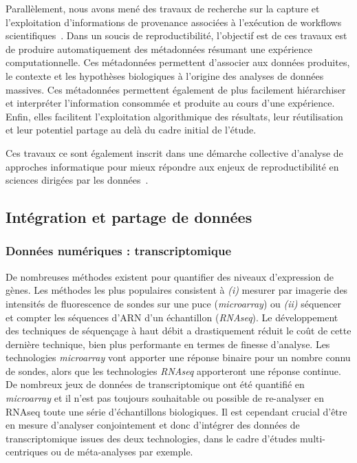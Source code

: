 \documentclass[a4paper,10pt]{article}
\theoremstyle{definition}
\begin{document}
Parallèlement, nous avons mené des travaux de recherche sur la capture et l'exploitation d'informations de provenance associées à l'exécution de workflows scientifiques~\cite{tapp16, eswc17}. Dans un soucis de reproductibilité, l'objectif est de ces travaux est de produire automatiquement des métadonnées résumant une expérience computationnelle. Ces métadonnées permettent d'associer aux données produites, le contexte et les hypothèses biologiques à l'origine des analyses de données massives. Ces métadonnées permettent également de plus facilement hiérarchiser et interpréter l'information consommée et produite au cours d'une expérience. Enfin, elles facilitent l'exploitation algorithmique des résultats, leur réutilisation et leur potentiel partage au delà du cadre initial de l'étude. 

Ces travaux ce sont également inscrit dans une démarche collective d'analyse de approches informatique pour mieux répondre aux enjeux de reproductibilité en sciences dirigées par les données~\cite{fgcs-repro-17}. 

\subsection{Intégration et partage de données}

\subsubsection{Données numériques : transcriptomique}
De nombreuses méthodes existent pour quantifier des niveaux d'expression de gènes. Les méthodes les plus populaires consistent à {\em (i)} mesurer par imagerie des intensités de fluorescence de sondes sur une puce ({\em microarray}) ou {\em (ii)} séquencer et compter les séquences d'ARN d'un échantillon ({\em RNAseq}). Le développement des techniques de séquençage à haut débit a drastiquement réduit le coût de cette dernière technique, bien plus performante en termes de finesse d'analyse. Les technologies {\em microarray} vont apporter une réponse binaire pour un nombre connu de sondes, alors que les technologies {\em RNAseq} apporteront une réponse continue. De nombreux jeux de données de transcriptomique ont été quantifié en {\em microarray} et il n'est pas toujours souhaitable ou possible de re-analyser en RNAseq toute une série d'échantillons biologiques. Il est cependant crucial d'être en mesure d'analyser conjointement et donc d'intégrer des données de transcriptomique issues des deux technologies, dans le cadre d'études multi-centriques ou de méta-analyses par exemple. 
\end{document}
